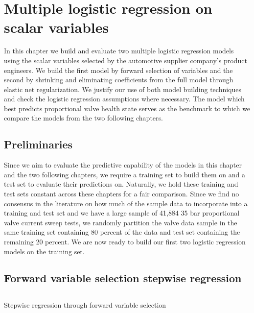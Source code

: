 \chapter{Multiple logistic regression on scalar variables}

In this chapter we build and evaluate two multiple logistic regression models using the scalar variables selected by the automotive supplier company's product engineers.
We build the first model by forward selection of variables and the second by shrinking and eliminating coefficients from the full model through elastic net regularization.
We justify our use of both model building techniques and check the logistic regression assumptions where necessary.
The model which best predicts proportional valve health state serves as the benchmark to which we compare the models from the two following chapters.

\section{Preliminaries}

Since we aim to evaluate the predictive capability of the models in this chapter and the two following chapters, we require a training set to build them on and a test set to evaluate their predictions on.
Naturally, we hold these training and test sets constant across these chapters for a fair comparison.
Since we find no consensus in the literature on how much of the sample data to incorporate into a training and test set and we have a large sample of 41,884 35 bar proportional valve current sweep tests, we randomly partition the valve data sample in the same training set containing 80 percent of the data and test set containing the remaining 20 percent.
We are now ready to build our first two logistic regression models on the training set.

\section{Forward variable selection stepwise regression}

\begin{listing}
  \inputminted[firstline=45,lastline=74,breaklines=true]{python}{../src/logistic_regression.py}
  \caption{Stepwise regression through forward variable selection}
  \label{lst:stepwise}
\end{listing}

